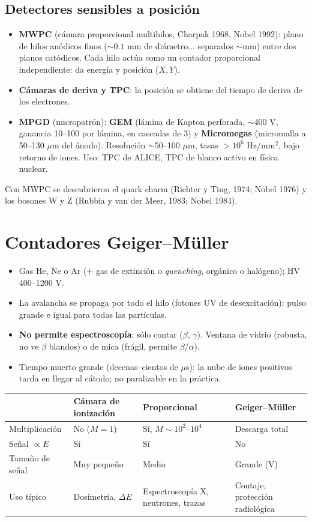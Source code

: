 \subsection{Detectores sensibles a posición}
\begin{itemize}
\item \textbf{MWPC} (cámara proporcional multihilos, Charpak 1968, Nobel 1992): plano de hilos anódicos finos
($\sim0.1$ mm de diámetro... separados $\sim$mm) entre dos planos catódicos. Cada hilo actúa como un contador
proporcional independiente: da energía y posición ($X,Y$).
\item \textbf{Cámaras de deriva y TPC}: la posición se obtiene del tiempo de deriva de los electrones.
\item \textbf{MPGD} (micropatrón): \textbf{GEM} (lámina de Kapton perforada, $\sim$400 V, ganancia 10--100 por lámina, en cascadas de 3)
y \textbf{Micromegas} (micromalla a 50--130 $\mu$m del ánodo). Resolución $\sim$50--100 $\mu$m, tasas $>10^6$ Hz/mm$^2$, bajo retorno de iones.
Uso: TPC de ALICE, TPC de blanco activo en física nuclear.
\end{itemize}
\begin{dato}
Con MWPC se descubrieron el quark charm (Richter y Ting, 1974; Nobel 1976) y los bosones W y Z (Rubbia y van der Meer, 1983; Nobel 1984).
\end{dato}

\section{Contadores Geiger--Müller}
\begin{itemize}
\item Gas He, Ne o Ar (+ gas de extinción o \emph{quenching}, orgánico o halógeno); HV 400--1200 V.
\item La avalancha se propaga por todo el hilo (fotones UV de desexcitación): pulso grande e igual para todas las partículas.
\item \textbf{No permite espectroscopía}: sólo contar ($\beta$, $\gamma$). Ventana de vidrio (robusta, no ve $\beta$ blandos) o de mica (frágil, permite $\beta$/$\alpha$).
\item Tiempo muerto grande (decenas--cientos de $\mu$s): la nube de iones positivos tarda en llegar al cátodo; no paralizable en la práctica.
\end{itemize}

\begin{center}\small
\begin{tabularx}{\linewidth}{lXXX}
\toprule
& Cámara de ionización & Proporcional & Geiger--Müller\\
\midrule
Multiplicación & No ($M=1$) & Sí, $M\sim10^2$--$10^4$ & Descarga total\\
Señal $\propto E$ & Sí & Sí & No\\
Tamaño de señal & Muy pequeño & Medio & Grande (V)\\
Uso típico & Dosimetría, $\Delta E$ & Espectroscopía X, neutrones, trazas & Contaje, protección radiológica\\
\bottomrule
\end{tabularx}
\end{center}
